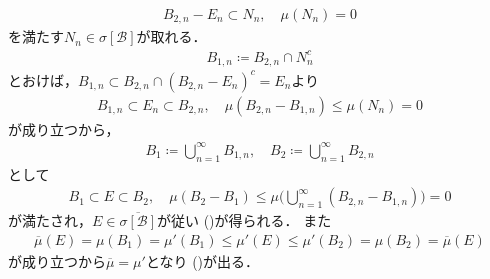\begin{prf}
\begin{description}
\begin{align}
						B_{2,n} - E_n \subset N_n, \quad \mu(N_n) = 0
					\end{align}
					を満たす$N_n \in \sigma[\mathcal{B}]$が取れる．
					\begin{align}
						B_{1,n} \coloneqq B_{2,n} \cap N_n^c
					\end{align}
					とおけば，$B_{1,n} \subset B_{2,n} \cap (B_{2,n} - E_n)^c = E_n$より
					\begin{align}
						B_{1,n} \subset E_n \subset B_{2,n},
						\quad \mu(B_{2,n} - B_{1,n}) \leq \mu(N_n) = 0
					\end{align}
					が成り立つから，
					\begin{align}
						B_1 \coloneqq \bigcup_{n=1}^\infty B_{1,n},
						\quad B_2 \coloneqq \bigcup_{n=1}^\infty B_{2,n}
					\end{align}
					として
					\begin{align}
						B_1 \subset E \subset B_2,
						\quad \mu(B_2 - B_1) \leq \mu\Biggl( \bigcup_{n=1}^\infty(B_{2,n} - B_{1,n}) \Biggr) = 0
					\end{align}
					が満たされ，$E \in \overline{\sigma[\mathcal{B}]}$が従い
					()が得られる．
					また
					\begin{align}
						\overline{\mu}(E) = \mu(B_1) = \mu'(B_1)
						\leq \mu'(E) \leq \mu'(B_2) = \mu(B_2) = \overline{\mu}(E)
					\end{align}
					が成り立つから$\overline{\mu} = \mu'$となり
					()が出る．
					\QED
			\end{description}
		\end{prf}